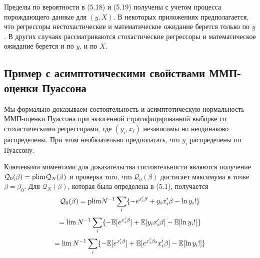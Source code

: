 Пределы по вероятности в (5.18) и (5.19) получены с учетом процесса порождающего данные для $(y,X)$. В некоторых приложениях предполагается, что регрессоры нестохастические и математическое ожидание берется только по $y$. В других случаях рассматриваются стохастические регрессоры и математическое ожидание берется и по $y$, и по $X$.

\subsection{Пример с асимптотическими свойствами ММП-оценки Пуассона}

Мы формально доказываем состоятельность и асимптотическую нормальность  ММП-оценки Пуассона при экзогенной стратифицированной выборке со стохастическими регрессорами, где $(y_i,x_i)$ независимы но неодинаково распределены. При этом необязательно предполагать, что $y_i$ распределены по Пуассону.

Ключевыми моментами для доказательства состоятельности являются получение $\mathcal{Q}_0(\beta)=\mathrm{plim } \mathcal{Q}_N(\beta)$ и проверка того, что $\mathcal{Q}_0(\beta)$ достигает максимума в точке $\beta=\beta_0$. Для $\mathcal{Q}_N(\beta)$, которая была определена в (5.1), получается
\[
\mathcal{Q}_0(\beta)= \mathrm{plim } N^{-1} \sum_i \{-e^{x'_i\beta}+y_i x'_i \beta - \ln y_i! \}
\]
\[
= \lim N^{-1} \sum_i \{-\mathbb{E}[e^{x'_i\beta}]+\mathbb{E}[y_i x'_i \beta] - \mathbb{E}[\ln y_i!] \} \\
\]
\[
= \lim N^{-1} \sum_i \{-\mathbb{E}[e^{x'_i\beta}]+\mathbb{E}[e^{x'_i \beta_0} x'_i \beta] - \mathbb{E}[\ln y_i!] \}
\]

